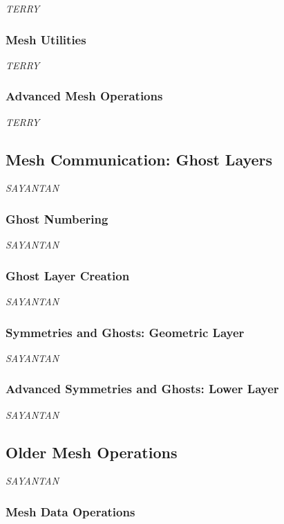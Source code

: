 {\it TERRY}

\subsubsection{Mesh Utilities}

{\it TERRY}

\subsubsection{Advanced Mesh Operations}

{\it TERRY}

\subsection{Mesh Communication: Ghost Layers}
\label{sec:ghost}

{\it SAYANTAN}

\subsubsection{Ghost Numbering}

{\it SAYANTAN}

\subsubsection{Ghost Layer Creation\label{SectionGhostLayerCreation}}

{\it SAYANTAN}

\subsubsection{Symmetries and Ghosts: Geometric Layer}

{\it SAYANTAN}

\subsubsection{Advanced Symmetries and Ghosts: Lower Layer}

{\it SAYANTAN}

\subsection{Older Mesh Operations}

{\it SAYANTAN}

\subsubsection{Mesh Data Operations}

